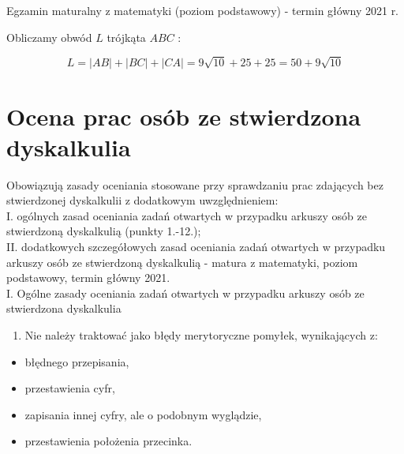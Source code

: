 \documentclass[10pt]{article}
\begin{document}
Egzamin maturalny z matematyki (poziom podstawowy) - termin główny 2021 r.

Obliczamy obwód $L$ trójkąta $A B C$ :

$$
L=|A B|+|B C|+|C A|=9 \sqrt{10}+25+25=50+9 \sqrt{10}
$$

\section*{Ocena prac osób ze stwierdzona dyskalkulia}
Obowiązują zasady oceniania stosowane przy sprawdzaniu prac zdających bez stwierdzonej dyskalkulii z dodatkowym uwzględnieniem:\\
I. ogólnych zasad oceniania zadań otwartych w przypadku arkuszy osób ze stwierdzoną dyskalkulią (punkty 1.-12.);\\
II. dodatkowych szczegółowych zasad oceniania zadań otwartych w przypadku arkuszy osób ze stwierdzoną dyskalkulią - matura z matematyki, poziom podstawowy, termin główny 2021.\\
I. Ogólne zasady oceniania zadań otwartych w przypadku arkuszy osób ze stwierdzona dyskalkulia

\begin{enumerate}
  \item Nie należy traktować jako błędy merytoryczne pomyłek, wynikających z:
\end{enumerate}

\begin{itemize}
  \item błędnego przepisania,
  \item przestawienia cyfr,
  \item zapisania innej cyfry, ale o podobnym wyglądzie,
  \item przestawienia położenia przecinka.
\end{itemize}
\end{document}
